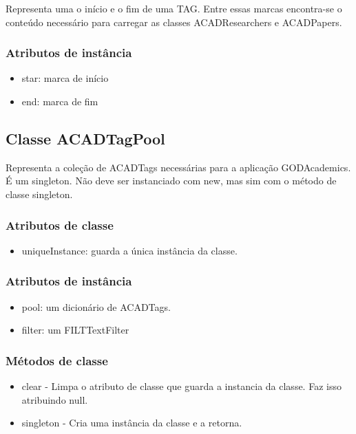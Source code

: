 Representa uma o início e o fim de uma TAG. Entre essas marcas encontra-se o conteúdo necessário para carregar as classes ACADResearchers e ACADPapers.

\subsubsection{Atributos de instância}

\begin{itemize}
  \item star: marca de início

  \item end: marca de fim

\end{itemize}

\subsection{Classe ACADTagPool}

Representa a coleção de ACADTags necessárias para a aplicação GODAcademics. É um singleton. Não deve ser instanciado com new, mas sim com o método de classe singleton.

\subsubsection{Atributos de classe}

\begin{itemize}
  \item uniqueInstance: guarda a única instância da classe.
\end{itemize}

\subsubsection{Atributos de instância}

\begin{itemize}
  \item pool: um dicionário de ACADTags.

  \item filter: um FILTTextFilter

\end{itemize}

\subsubsection{Métodos de classe}

\begin{itemize}

  \item clear - Limpa o atributo de classe que guarda a instancia da classe. Faz isso atribuindo null.

  \item singleton - Cria uma instância da classe e a retorna.

\end{itemize}


